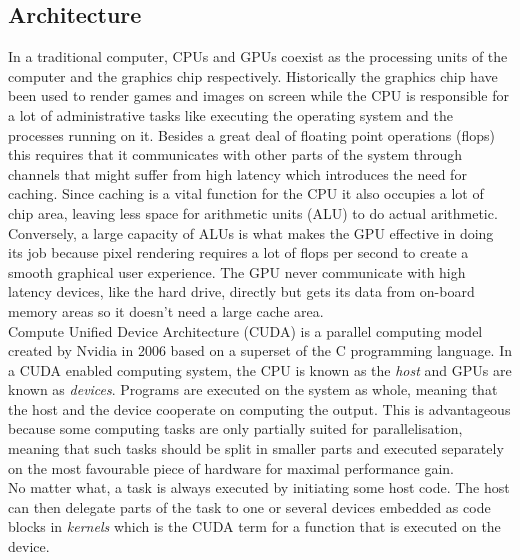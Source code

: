 
\subsection{Architecture}
In a traditional computer, CPUs and GPUs coexist as the processing units of the computer and the graphics chip respectively. Historically the graphics chip have been used to render games and images on screen while the CPU is responsible for a lot of administrative tasks like executing the operating system and the processes running on it. Besides a great deal of floating point operations (flops) this requires that it communicates with other parts of the system through channels that might suffer from high latency which introduces the need for caching. Since caching is a vital function for the CPU it also occupies a lot of chip area, leaving less space for arithmetic units (ALU) to do actual arithmetic. \\

Conversely, a large capacity of ALUs is what makes the GPU effective in doing its job because pixel rendering requires a lot of flops per second to create a smooth graphical user experience. The GPU never communicate with high latency devices, like the hard drive, directly but gets its data from on-board memory areas so it doesn't need a large cache area.\\

Compute Unified Device Architecture (CUDA) is a parallel computing model created by Nvidia in 2006 based on a superset of the C programming language. In a CUDA enabled computing system, the CPU is known as the \emph{host} and GPUs are known as \emph{devices}. Programs are executed on the system as whole, meaning that the host and the device cooperate on computing the output. This is advantageous because some computing tasks are only partially suited for parallelisation, meaning that such tasks should be split in smaller parts and executed separately on the most favourable piece of hardware for maximal performance gain. \\

No matter what, a task is always executed by initiating some host code. The host can then delegate parts of the task to one or several devices embedded as code blocks in \emph{kernels} which is the CUDA term for a function that is executed on the device.\\

